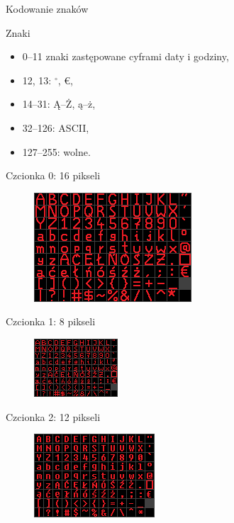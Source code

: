 \documentclass{beamer}
\begin{document}
\begin{frame}{Kodowanie znaków}
	\begin{block}{Znaki}
		\begin{itemize}
			\item 0--11 znaki zastępowane cyframi daty i godziny,
			\item 12, 13: $^\circ$, \euro,
			\item 14--31: Ą--Ż, ą--ż,
			\item 32--126: ASCII,
			\item 127--255: wolne.
		\end{itemize}
	\end{block}
\end{frame}

\begin{frame}{Czcionka 0: 16 pikseli}
	\begin{figure}[h]
		\centering
		\includegraphics[scale=1.2]{img/czcionka4.png}
	\end{figure}
\end{frame}

\begin{frame}{Czcionka 1: 8 pikseli}
	\begin{figure}[h]
		\centering
		\includegraphics[scale=2.4]{img/czcionkb3.png}
	\end{figure}
\end{frame}

\begin{frame}{Czcionka 2: 12 pikseli}
	\begin{figure}[h]
		\centering
		\includegraphics[scale=1.6]{img/czcionkc3.png}
	\end{figure}
\end{frame}
\end{document}
